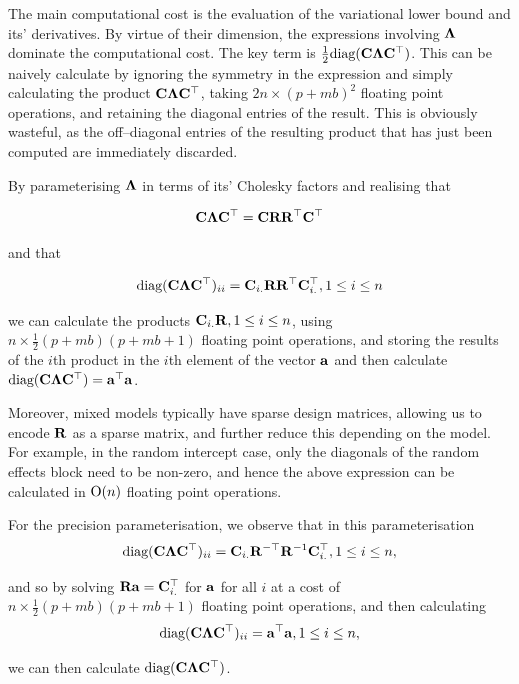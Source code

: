 	The main computational cost is the evaluation of the variational lower bound and its' derivatives. By
	virtue of their dimension, the expressions involving ${\boldsymbol \Lambda}$ dominate the computational cost. The key
	term is $\frac{1}{2} \text{diag}({\bf C} {\boldsymbol \Lambda} {\bf C}^\top)$. This can be naively calculate by ignoring the
	symmetry in the expression and simply calculating the product ${\bf C} {\boldsymbol \Lambda} {\bf C}^\top$, taking $2 n
	\times (p + m b)^2$ floating point operations, and retaining the diagonal entries of the result. This is
	obviously wasteful, as the off--diagonal entries of the resulting product that has just been computed
	are immediately discarded.
		
	By parameterising ${\boldsymbol \Lambda}$ in terms of its' Cholesky factors and realising that
		
	\[
		{\bf C} {\boldsymbol \Lambda} {\bf C}^\top = {\bf C} {\bf R} {\bf R}^\top {\bf C}^\top
	\]
		
	\noindent and that
		
	\[
		\text{diag}({\bf C} {\boldsymbol \Lambda} {\bf C}^\top)_{ii} = {\bf C}_{i .} {\bf R} {\bf R}^\top {\bf C}_{i .}^\top, 1 \leq i \leq n
	\]
		
	\noindent we can calculate the products ${\bf C}_{i .} {\bf R}, 1 \leq i \leq n$, using $n \times \frac{1}{2}(p + m
	b)(p + m b   + 1)$ floating point operations, and storing the results of the $i$th product in the $i$th
	element of the   vector ${\bf a}$ and then calculate $\text{diag}({\bf C} {\boldsymbol \Lambda} {\bf C}^\top) = {\bf a}^\top {\bf a}$.
		
	Moreover, mixed models typically have sparse design matrices, allowing us to encode ${\bf R}$ as a sparse matrix, and	further reduce   this depending on the model. For example, in the random intercept case, only the diagonals of the random effects block need to be non-zero, and hence the above expression can be calculated in
	$\text{O}(n)$ floating point operations.
		
		
	For the precision parameterisation, we observe that in this parameterisation
	\[
		\text{diag}({\bf C} {\boldsymbol \Lambda} {\bf C}^\top)_{ii} = {\bf C}_{i .} {\bf R}^{-\top} {\bf R}^{-1} {\bf C}_{i .}^\top, 1 \leq i \leq n,
	\]
		
	\noindent and so by solving ${\bf R} {\bf a} = {\bf C}_{i .}^\top$ for ${\bf a}$ for all $i$ at a cost of $n \times
	\frac{1}{2} (p + m b) (p + m b + 1)$ floating point operations, and then calculating
	\[
		\text{diag}({\bf C} {\boldsymbol \Lambda} {\bf C}^\top)_{ii} = {\bf a}^\top {\bf a}, 1 \leq i \leq n,
	\]
		
	\noindent we can then calculate $\text{diag}({\bf C} {\boldsymbol \Lambda} {\bf C}^\top)$.
		
